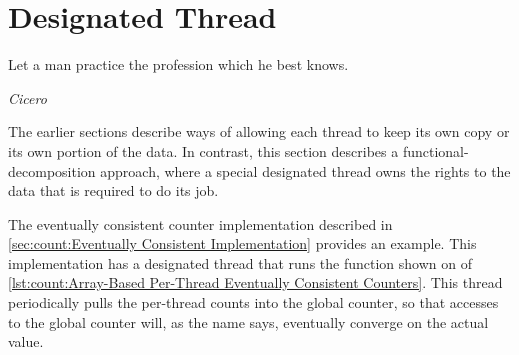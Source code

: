 \QuickQuizEnd

\section{Designated Thread}
\label{sec:owned:Designated Thread}
%
\epigraph{Let a man practice the profession which he best knows.}
	 {\emph{Cicero}}

The earlier sections describe ways of allowing each thread to keep its
own copy or its own portion of the data.
In contrast, this section describes a functional-decomposition approach,
where a special designated thread owns the rights to the data
that is required to do its job.
\begin{fcvref}
The eventually consistent counter implementation described in
\cref{sec:count:Eventually Consistent Implementation} provides an example.
This implementation has a designated thread that runs the
 function shown on  of
\cref{lst:count:Array-Based Per-Thread Eventually Consistent Counters}.
This  thread periodically pulls the per-thread counts
into the global counter, so that accesses to the global counter will,
as the name says, eventually converge on the actual value.
\end{fcvref}

